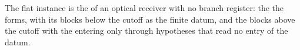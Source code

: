 
The flat instance is the  of an optical receiver
with no branch register: the  the  forms, with
its blocks below the cutoff as the finite datum, and the blocks above the
cutoff with the  entering only through hypotheses that
read no entry of the datum.

